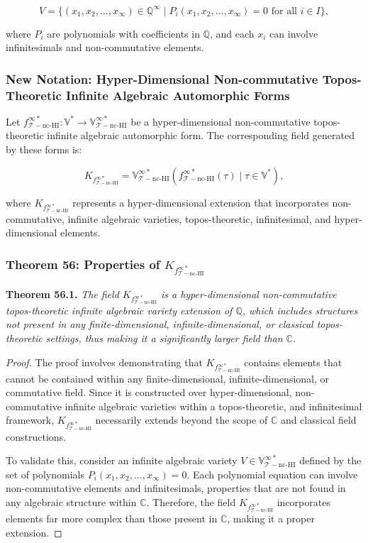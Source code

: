 \documentclass{article}
\begin{document}
\[
V = \{(x_1, x_2, \dots, x_{\infty}) \in \mathbb{Q}^{\infty} \mid P_i(x_1, x_2, \dots, x_{\infty}) = 0 \text{ for all } i \in I\},
\]

where \(P_i\) are polynomials with coefficients in \(\mathbb{Q}\), and each \(x_i\) can involve infinitesimals and non-commutative elements.

\subsubsection{New Notation: Hyper-Dimensional Non-commutative Topos-Theoretic Infinite Algebraic Automorphic Forms}
Let \(f_{\mathcal{T}-\text{nc-HI}}^{\infty *}: \mathbb{V}^* \to \mathbb{V}_{\mathcal{T}-\text{nc-HI}}^{\infty *}\) be a hyper-dimensional non-commutative topos-theoretic infinite algebraic automorphic form. The corresponding field generated by these forms is:

\[
K_{f_{\mathcal{T}-\text{nc-HI}}^{\infty *}} = \mathbb{V}_{\mathcal{T}-\text{nc-HI}}^{\infty *}(f_{\mathcal{T}-\text{nc-HI}}^{\infty *}(\tau) \mid \tau \in \mathbb{V}^*),
\]

where \(K_{f_{\mathcal{T}-\text{nc-HI}}^{\infty *}}\) represents a hyper-dimensional extension that incorporates non-commutative, infinite algebraic varieties, topos-theoretic, infinitesimal, and hyper-dimensional elements.

\subsubsection{Theorem 56: Properties of \(K_{f_{\mathcal{T}-\text{nc-HI}}^{\infty *}}\)}
\textbf{Theorem 56.1.} \textit{The field \(K_{f_{\mathcal{T}-\text{nc-HI}}^{\infty *}}\) is a hyper-dimensional non-commutative topos-theoretic infinite algebraic variety extension of \(\mathbb{Q}\), which includes structures not present in any finite-dimensional, infinite-dimensional, or classical topos-theoretic settings, thus making it a significantly larger field than \(\mathbb{C}\).}

\begin{proof}
The proof involves demonstrating that \(K_{f_{\mathcal{T}-\text{nc-HI}}^{\infty *}}\) contains elements that cannot be contained within any finite-dimensional, infinite-dimensional, or commutative field. Since it is constructed over hyper-dimensional, non-commutative infinite algebraic varieties within a topos-theoretic, and infinitesimal framework, \(K_{f_{\mathcal{T}-\text{nc-HI}}^{\infty *}}\) necessarily extends beyond the scope of \(\mathbb{C}\) and classical field constructions.

To validate this, consider an infinite algebraic variety \(V \in \mathbb{V}_{\mathcal{T}-\text{nc-HI}}^{\infty *}\) defined by the set of polynomials \(P_i(x_1, x_2, \dots, x_{\infty}) = 0\). Each polynomial equation can involve non-commutative elements and infinitesimals, properties that are not found in any algebraic structure within \(\mathbb{C}\). Therefore, the field \(K_{f_{\mathcal{T}-\text{nc-HI}}^{\infty *}}\) incorporates elements far more complex than those present in \(\mathbb{C}\), making it a proper extension.
\end{proof}
\end{document}
